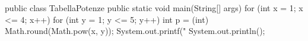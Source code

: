 \begin{unipdcode}[language=Java]
public class TabellaPotenze {
    public static void main(String[] args) {
        for (int x = 1; x <= 4; x++) {
            for (int y = 1; y <= 5; y++) {
                int p = (int) Math.round(Math.pow(x, y));
                System.out.printf("%
            }
            System.out.println();
        }
    }
}
\end{unipdcode}
